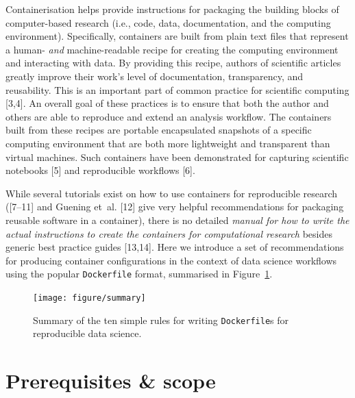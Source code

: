\documentclass[10pt,letterpaper]{article}
\begin{document}
Containerisation helps provide instructions for packaging the building
blocks of computer-based research (i.e., code, data, documentation, and
the computing environment). Specifically, containers are built from
plain text files that represent a human- \emph{and} machine-readable
recipe for creating the computing environment and interacting with data.
By providing this recipe, authors of scientific articles greatly improve
their work's level of documentation, transparency, and reusability. This
is an important part of common practice for scientific computing
{[}3,4{]}. An overall goal of these practices is to ensure that both the
author and others are able to reproduce and extend an analysis workflow.
The containers built from these recipes are portable encapsulated
snapshots of a specific computing environment that are both more
lightweight and transparent than virtual machines. Such containers have
been demonstrated for capturing scientific notebooks {[}5{]} and
reproducible workflows {[}6{]}.

While several tutorials exist on how to use containers for reproducible
research ({[}7--11{]} and Guening et~al. {[}12{]} give very helpful
recommendations for packaging reusable software in a container), there
is no detailed \emph{manual for how to write the actual instructions to
create the containers for computational research} besides generic best
practice guides {[}13,14{]}. Here we introduce a set of recommendations
for producing container configurations in the context of data science
workflows using the popular \texttt{Dockerfile} format, summarised in
Figure~\ref{fig:summary}.

\begin{figure}[h]
{\centering \texttt{[image: figure/summary]} 
}
\caption{Summary of the ten simple rules for writing \texttt{Dockerfile}s for reproducible data science.}\label{fig:summary}
\end{figure}

\hypertarget{prerequisites-scope}{%
\section{Prerequisites \& scope}\label{prerequisites-scope}}
\end{document}
